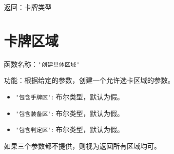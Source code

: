 返回：卡牌类型

\section{卡牌区域}

函数名称：\verb|'创建具体区域'|

功能：根据给定的参数，创建一个允许选卡区域的参数。

\begin{itemize}
  \item \verb|'包含手牌区'|: 布尔类型，默认为假。
  \item \verb|'包含装备区'|: 布尔类型，默认为假。
  \item \verb|'包含判定区'|: 布尔类型，默认为假。
\end{itemize}

如果三个参数都不提供，则视为返回所有区域均可。

